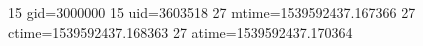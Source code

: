 15 gid=3000000
15 uid=3603518
27 mtime=1539592437.167366
27 ctime=1539592437.168363
27 atime=1539592437.170364
